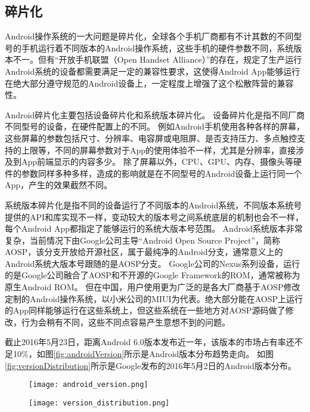 \subsection{碎片化}

Android操作系统的一大问题是碎片化\parencite{android_fragment}，全球各个手机厂商都有不计其数的不同型号的手机运行着不同版本的Android操作系统，这些手机的硬件参数不同，系统版本不一。但有“开放手机联盟（Open Handset Alliance）”的存在，规定了生产运行Android系统的设备都需要满足一定的兼容性要求，这使得Android App能够运行在绝大部分遵守规范的Android设备上，一定程度上增强了这个松散阵营的兼容性。

Android碎片化主要包括设备碎片化和系统版本碎片化。
设备碎片化是指不同厂商不同型号的设备，在硬件配置上的不同。
例如Android手机使用各种各样的屏幕，这些屏幕的参数包括尺寸、分辨率、电容屏或电阻屏、是否支持压力、多点触控支持的上限等，不同的屏幕参数对于App的使用体验不一样，尤其是分辨率，直接涉及到App前端显示的内容多少。
除了屏幕以外，CPU、GPU、内存、摄像头等硬件的参数同样多种多样，造成的影响就是在不同型号的Android设备上运行同一个App，产生的效果截然不同。

系统版本碎片化是指不同的设备运行了不同版本的Android系统，不同版本系统号提供的API和库实现不一样，变动较大的版本号之间系统底层的机制也会不一样，每个Android App都指定了能够运行的系统大版本号范围。
Android系统版本非常复杂，当前情况下由Google公司主导“Android Open Source Project”，简称AOSP，该分支开放给开源社区，属于最纯净的Android分支，通常意义上的Android系统大版本号跟随的是AOSP分支。
Google公司的Nexus系列设备，运行的是Google公司融合了AOSP和不开源的Google Framework的ROM，通常被称为原生Android ROM。
但在中国，用户使用更为广泛的是各大厂商基于AOSP修改定制的Android操作系统，以小米公司的MIUI为代表。绝大部分能在AOSP上运行的App同样能够运行在这些系统上，但这些系统在一些地方对AOSP源码做了修改，行为会稍有不同，这些不同点容易产生意想不到的问题。

截止2016年5月23日，距离Android 6.0版本发布近一年，该版本的市场占有率还不足10\%，如图\ref{fig:androidVersion}所示是Android版本分布趋势走向。
如图\ref{fig:versionDistribution}所示是Google发布的2016年5月2日的Android版本分布。

\begin{figure}[!htp]
	\centering
	\texttt{[image: android\_version.png]}
\end{figure}

\begin{figure}[!htp]
	\centering
	\texttt{[image: version\_distribution.png]}
\end{figure}

